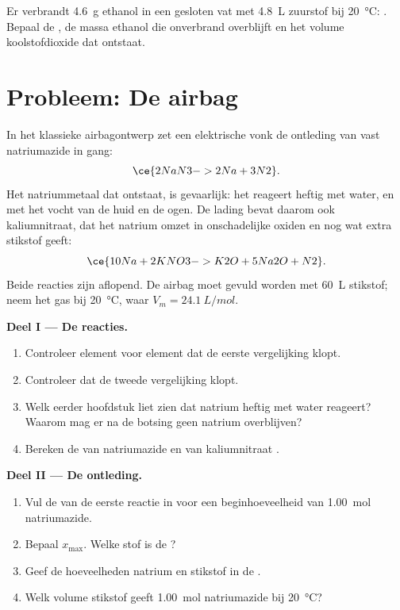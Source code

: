 \begin{exercise}[$\star\star\star$]\label{exo:g10:reaction-progress-table:15}
Er verbrandt \qty{4.6}{g} ethanol  in een gesloten vat met
\qty{4.8}{L} zuurstof bij \qty{20}{\celsius}:
. Bepaal de , de massa
ethanol die onverbrand overblijft en het volume koolstofdioxide dat
ontstaat.
\end{exercise}

\section{Probleem: De airbag}

\begin{problem}
\label{pb:g10:reaction-progress-table:1}
In het klassieke airbagontwerp zet een elektrische vonk de ontleding van
vast natriumazide in gang:
\[
  \ce{2NaN3 -> 2Na + 3N2} .
\]
Het natriummetaal dat ontstaat, is gevaarlijk: het reageert heftig met
water, en met het vocht van de huid en de ogen. De lading bevat daarom
ook kaliumnitraat, dat het natrium omzet in onschadelijke oxiden en nog
wat extra stikstof geeft:
\[
  \ce{10Na + 2KNO3 -> K2O + 5Na2O + N2} .
\]
Beide reacties zijn aflopend. De airbag moet gevuld worden met
\qty{60}{L} stikstof; neem het gas bij \qty{20}{\celsius}, waar
$V_m = \qty{24.1}{L/mol}$.

\medskip
\noindent\textbf{Deel I --- De reacties.}
\begin{enumerate}
  \item Controleer element voor element dat de eerste vergelijking
        klopt.
  \item Controleer dat de tweede vergelijking klopt.
  \item Welk eerder hoofdstuk liet zien dat natrium heftig met water
        reageert? Waarom mag er na de botsing geen natrium overblijven?
  \item Bereken de  van natriumazide  en van
        kaliumnitraat .
\end{enumerate}

\medskip
\noindent\textbf{Deel II --- De ontleding.}
\begin{enumerate}[resume]
  \item Vul de  van de eerste reactie in voor een
        beginhoeveelheid van \qty{1.00}{mol} natriumazide.
  \item Bepaal $x_{\max}$. Welke stof is de ?
  \item Geef de hoeveelheden natrium en stikstof in de .
  \item Welk volume stikstof geeft \qty{1.00}{mol} natriumazide bij
        \qty{20}{\celsius}?
\end{enumerate}


\end{problem}
